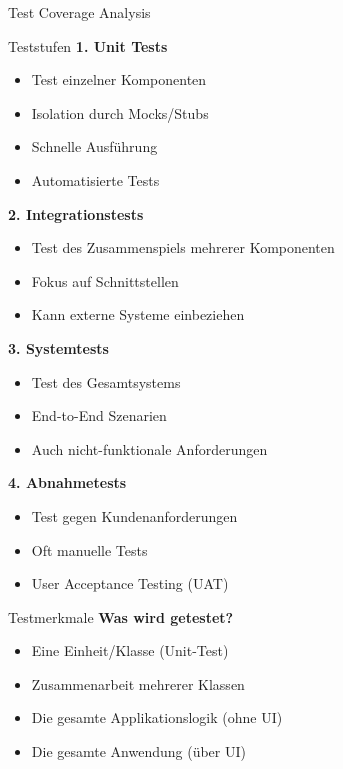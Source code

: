 \begin{example2}{Test Coverage Analysis}
\begin{concept}{Teststufen}
\textbf{1. Unit Tests}
\begin{itemize}
    \item Test einzelner Komponenten
    \item Isolation durch Mocks/Stubs
    \item Schnelle Ausführung
    \item Automatisierte Tests
\end{itemize}

\textbf{2. Integrationstests}
\begin{itemize}
    \item Test des Zusammenspiels mehrerer Komponenten
    \item Fokus auf Schnittstellen
    \item Kann externe Systeme einbeziehen
\end{itemize}

\textbf{3. Systemtests} 
\begin{itemize}
    \item Test des Gesamtsystems
    \item End-to-End Szenarien
    \item Auch nicht-funktionale Anforderungen
\end{itemize}

\textbf{4. Abnahmetests}
\begin{itemize}
    \item Test gegen Kundenanforderungen
    \item Oft manuelle Tests
    \item User Acceptance Testing (UAT)
\end{itemize}
\end{concept}

\begin{KR}{Testmerkmale}
\textbf{Was wird getestet?}
\begin{itemize}
    \item Eine Einheit/Klasse (Unit-Test)
    \item Zusammenarbeit mehrerer Klassen
    \item Die gesamte Applikationslogik (ohne UI)
    \item Die gesamte Anwendung (über UI)
\end{itemize}


\end{KR}
\end{example2}
